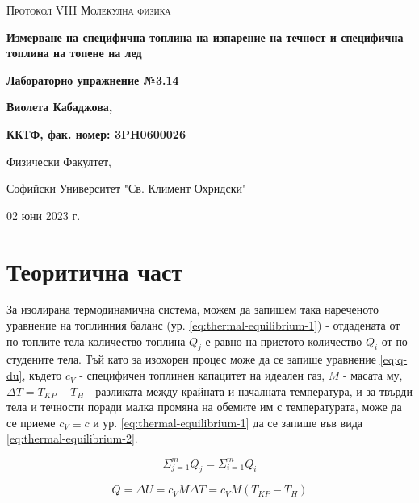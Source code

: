 \documentclass[12pt]{article}
\begin{document}
\begin{titlepage}
	\flushleft
	{\scshape\Large Протокол VIII \hspace{2cm} Молекулна физика\par}
	\vspace{4cm}
	{\huge\bfseries Измерване на специфична топлина на изпарение на течност и специфична топлина на топене на лед\par}
	\vspace{1cm}
	{\LARGE\bfseries Лабораторно упражнение №3.14\par}
	\vspace{4cm}
    {\LARGE\bfseries Виолета Кабаджова, \par}
    {\large\bfseries ККТФ, фак. номер: 3PH0600026\par}
	\vspace{1cm}
	
	{\large Физически Факултет, 
	
	Софийски Университет "Св. Климент Охридски"
	
	02 юни 2023 г.\par}
	
\end{titlepage}

\section{Теоритична част}\label{sec:theoretical-part}
За изолирана термодинамична система, можем да запишем така нареченото уравнение на топлинния баланс (ур. \ref{eq:thermal-equilibrium-1}) - отдадената от по-топлите тела количество топлина $Q_j$ е равно на приетото количество $Q_i$ от по-студените тела. Тъй като за изохорен процес може да се запише уравнение \ref{eq:q-du}, където $c_V$ - специфичен топлинен капацитет на идеален газ, $M$ - масата му, $\Delta T = T_{KP} - T_H$ - разликата между крайната и началната температура, и за твърди тела и течности поради малка промяна на обемите им с температурата, може да се приеме $c_V \equiv c$ и ур. \ref{eq:thermal-equilibrium-1} да се запише във вида \ref{eq:thermal-equilibrium-2}.

\begin{equation}\label{eq:thermal-equilibrium-1}
    \Sigma_{j=1}^mQ_j = \Sigma_{i=1}^mQ_i
\end{equation}

\begin{equation}\label{eq:q-du}
    Q = \Delta U = c_V M \Delta T = c_V M (T_{KP} - T_H) 
\end{equation}
\end{document}
